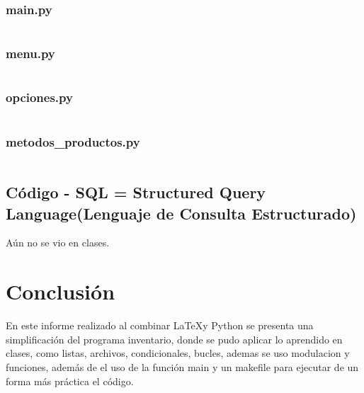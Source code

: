 \documentclass[12pt]{article}
\begin{document}
\subsubsection{main.py}
\inputminted[fontsize=\small, breaklines=true]{python}{CodigoCSV/main.py}

\subsubsection{menu.py}
\inputminted[fontsize=\small, breaklines=true]{python}{CodigoCSV/menu.py}

\subsubsection{opciones.py}
\inputminted[fontsize=\small, breaklines=true]{python}{CodigoCSV/opciones.py}

\subsubsection{metodos\_productos.py}
\inputminted[fontsize=\small, breaklines=true]{python}{CodigoCSV/metodos_productos.py}
\subsection{Código - SQL = Structured Query Language(Lenguaje de Consulta Estructurado)}

Aún no se vio en clases.
\section{Conclusión}

En este informe realizado al combinar \LaTeX y Python se presenta una simplificación del programa inventario, donde se pudo aplicar lo aprendido en clases, como listas, archivos,  condicionales, bucles, ademas se uso modulacion y funciones, además de el uso de la función main y un makefile para ejecutar de un forma más práctica el código.
\end{document}
